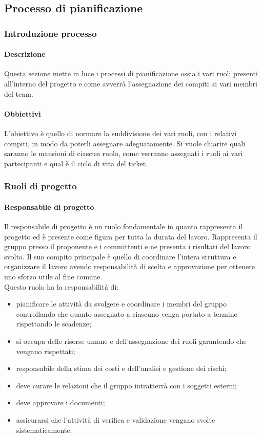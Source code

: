 	\subsection{Processo di pianificazione}
		\subsubsection{Introduzione processo}
			\paragraph{Descrizione}
				Questa sezione mette in luce i processi di pianificazione ossia i vari ruoli presenti all’interno del progetto e come avverrà l’assegnazione dei compiti ai vari membri del team. 
			\paragraph{Obbiettivi}
				L’obiettivo è quello di normare la suddivisione dei vari ruoli, con i relativi compiti, in modo da poterli assegnare adeguatamente. Si vuole chiarire quali saranno le mansioni di ciascun ruolo, come verranno assegnati i ruoli ai vari partecipanti e qual è il ciclo di vita del ticket.
		\subsubsection{Ruoli di progetto}
			\paragraph{Responsabile di progetto}
				Il responsabile di progetto è un ruolo fondamentale in quanto rappresenta il progetto ed è presente come figura per tutta la durata del lavoro. Rappresenta il gruppo presso il proponente e i committenti e ne presenta i risultati del lavoro svolto. Il suo compito principale è quello di coordinare l’intera struttura e organizzare il lavoro avendo responsabilità di scelta e approvazione per ottenere uno sforzo utile al fine comune.\\
				Questo ruolo ha la responsabilità di: \\
				\begin{itemize}
					\item pianificare le attività da svolgere e coordinare i membri del gruppo controllando che quanto assegnato a ciascuno venga portato a termine rispettando le scadenze;
					\item	si occupa delle risorse umane e dell’assegnazione dei ruoli garantendo che vengano rispettati;
					\item	responsabile della stima dei costi e dell’analisi e gestione dei rischi;
					\item	deve curare le relazioni che il gruppo intratterrà con i soggetti esterni;
					\item deve approvare i documenti;
					\item assicurarsi che l’attività di verifica e validazione vengano svolte sistematicamente.
				\end{itemize}
